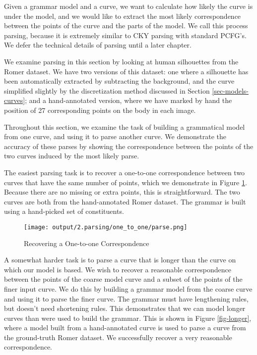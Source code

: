 
Given a grammar model and a curve, we want to calculate how likely the
curve is under the model, and we would like to extract the most likely
correspondence between the points of the curve and the parts of the
model. We call this process parsing, because it is extremely similar
to CKY parsing with standard PCFG's. We defer the technical details of
parsing until a later chapter.

We examine parsing in this section by looking at human silhouettes
from the Romer dataset. We have two versions of this dataset: one
where a silhouette has been automatically extracted by subtracting the
background, and the curve simplified slightly by the discretization
method discussed in Section \ref{sec-models-curves}; and a
hand-annotated version, where we have marked by hand the position of
27 corresponding points on the body in each image. 

Throughout this section, we examine the task of building a grammatical
model from one curve, and using it to parse another curve. We
demonstrate the accuracy of these parses by showing the correspondence
between the points of the two curves induced by the most likely parse.

The easiest parsing task is to recover a one-to-one correspondence
between two curves that have the same number of points, which we
demonstrate in Figure \ref{fig-one-to-one}. Because there are no
missing or extra points, this is straightforward.  The two curves are
both from the hand-annotated Romer dataset. The grammar is built using
a hand-picked set of constituents.

\begin{figure}
\texttt{[image: output/2.parsing/one\_to\_one/parse.png]}
\caption{Recovering a One-to-one Correspondence}
\label{fig-one-to-one}
\end{figure}

A somewhat harder task is to parse a curve that is longer than the
curve on which our model is based. We wish to recover a reasonable
correspondence between the points of the coarse model curve and a
subset of the points of the finer input curve. We do this by building
a grammar model from the coarse curve and using it to parse the finer
curve. The grammar must have lengthening rules, but doesn't need
shortening rules. This demonstrates that we can model longer curves
than were used to build the grammar. This is shown in Figure
\ref{fig-longer}, where a model built from a hand-annotated curve is
used to parse a curve from the ground-truth Romer dataset. We
successfully recover a very reasonable correspondence.

